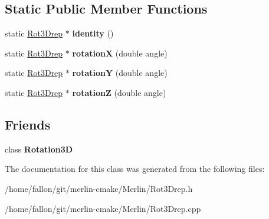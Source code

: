 \subsection*{Static Public Member Functions}
\begin{DoxyCompactItemize}
\item 
\mbox{\label{classRot3Drep_a537c9be08480edac92df742457d2c91e}} 
static \hyperlink{classRot3Drep}{Rot3\+Drep} $\ast$ {\bfseries identity} ()
\item 
\mbox{\label{classRot3Drep_a6c31a707b20d354ed5274e63e57662cc}} 
static \hyperlink{classRot3Drep}{Rot3\+Drep} $\ast$ {\bfseries rotationX} (double angle)
\item 
\mbox{\label{classRot3Drep_aa80cbaf80e2182bcd4874bb93b61e6f3}} 
static \hyperlink{classRot3Drep}{Rot3\+Drep} $\ast$ {\bfseries rotationY} (double angle)
\item 
\mbox{\label{classRot3Drep_a5d7f88f83689785334f8114a6e82a3a8}} 
static \hyperlink{classRot3Drep}{Rot3\+Drep} $\ast$ {\bfseries rotationZ} (double angle)
\end{DoxyCompactItemize}
\subsection*{Friends}
\begin{DoxyCompactItemize}
\item 
\mbox{\label{classRot3Drep_ad2119ee6f154f26d86a6a685ee1ccb1f}} 
class {\bfseries Rotation3D}
\end{DoxyCompactItemize}


The documentation for this class was generated from the following files\+:\begin{DoxyCompactItemize}
\item 
/home/fallon/git/merlin-\/cmake/\+Merlin/Rot3\+Drep.\+h\item 
/home/fallon/git/merlin-\/cmake/\+Merlin/Rot3\+Drep.\+cpp\end{DoxyCompactItemize}
